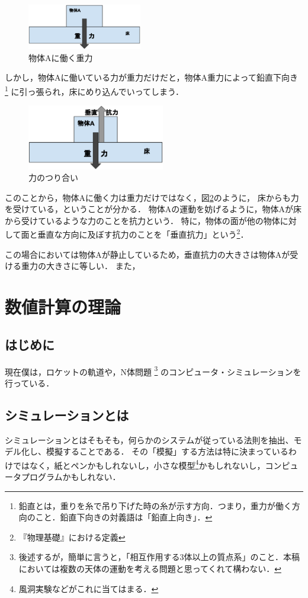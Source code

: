 \documentclass[b5paper]{ujreport}
\begin{document}
\begin{figure}[htbp]
\begin{center}
\includegraphics[width=5cm]{img/力のつり合い-重力.eps}
\end{center}
\caption{物体Aに働く重力}
\label{object_on_floor_with_gravity}
\end{figure}

しかし，物体Aに働いている力が重力だけだと，物体A重力によって鉛直下向き
\footnote{鉛直とは，重りを糸で吊り下げた時の糸が示す方向．つまり，重力が働く方向のこと．鉛直下向きの対義語は「鉛直上向き」．}
に引っ張られ，床にめり込んでいってしまう．

\begin{figure}[htbp]
\begin{center}
\includegraphics[width=6cm]{img/力のつり合い.eps}
\end{center}
\label{object_on_floor_with_balance}
\caption{力のつり合い}
\end{figure}

このことから，物体Aに働く力は重力だけではなく，図\ref{object_on_floor_with_balance}のように，
床からも力を受けている，ということが分かる．
物体Aの運動を妨げるように，物体Aが床から受けているような力のことを抗力という．
特に，物体の面が他の物体に対して面と垂直な方向に及ぼす抗力のことを「垂直抗力」という\footnote{『物理基礎』における定義}．

この場合においては物体Aが静止しているため，垂直抗力の大きさは物体Aが受ける重力の大きさに等しい．
また，


\chapter{数値計算の理論}
\section{はじめに}
現在僕は，ロケットの軌道や，N体問題
\footnote{後述するが，簡単に言うと，「相互作用する3体以上の質点系」のこと．本稿においては複数の天体の運動を考える問題と思ってくれて構わない．}
のコンピュータ・シミュレーションを行っている．

\section{シミュレーションとは}
シミュレーションとはそもそも，何らかのシステムが従っている法則を抽出、モデル化し、模擬することである．
その「模擬」する方法は特に決まっているわけではなく，紙とペンかもしれないし，小さな模型\footnote{風洞実験などがこれに当てはまる．}かもしれないし，コンピュータプログラムかもしれない．
\end{document}
